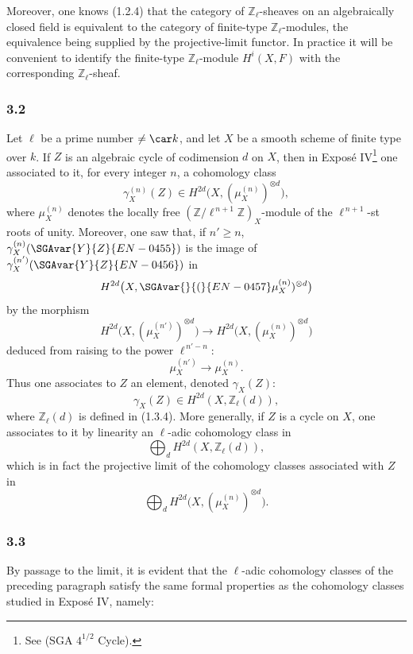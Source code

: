 Moreover, one knows (1.2.4) that the category of \(\mathbb Z_\ell\)-sheaves on an algebraically closed field is equivalent to the category of finite-type \(\mathbb Z_\ell\)-modules, the equivalence being supplied by the projective-limit functor. In practice it will be convenient to identify the finite-type \(\mathbb Z_\ell\)-module \(H^i(X,F)\) with the corresponding \(\mathbb Z_\ell\)-sheaf.

\subsubsection*{3.2}
Let \(\ell\) be a prime number \(\ne\car k\), and let \(X\) be a smooth scheme of finite type over \(k\). If \(Z\) is an algebraic cycle of codimension \(d\) on \(X\), then in Exposé IV\footnote{See (SGA \(4^{1/2}\) Cycle).} one associated to it, for every integer \(n\), a cohomology class
\[
\gamma_X^{(n)}(Z)\in H^{2d}\bigl(X,(\mu_X^{(n)})^{\otimes d}\bigr),
\]
where \(\mu_X^{(n)}\) denotes the locally free \((\mathbb Z/\ell^{\,n+1}\mathbb Z)_X\)-module of the \(\ell^{\,n+1}\)-st roots of unity. Moreover, one saw that, if \(n'\ge n\), \(\gamma_X^{(n)}(\SGAvar{Y}{Z}{EN-0455})\) is the image of \(\gamma_X^{(n')}(\SGAvar{Y}{Z}{EN-0456})\) in
\[
H^{2d}\bigl(X,\SGAvar{}{(}{EN-0457}\mu_X^{(n)})^{\otimes d}\bigr)
\]
by the morphism
\[
H^{2d}\bigl(X,(\mu_X^{(n')})^{\otimes d}\bigr)
\longrightarrow
H^{2d}\bigl(X,(\mu_X^{(n)})^{\otimes d}\bigr)
\]
deduced from raising to the power \(\ell^{\,n'-n}\):
\[
\mu_X^{(n')}\longrightarrow \mu_X^{(n)}.
\]
Thus one associates to \(Z\) an element, denoted \(\gamma_X(Z)\):
\[
\gamma_X(Z)\in H^{2d}(X,\mathbb Z_\ell(d)),
\]
where \(\mathbb Z_\ell(d)\) is defined in (1.3.4). More generally, if \(Z\) is a cycle on \(X\), one associates to it by linearity an \(\ell\)-adic cohomology class in
\[
\bigoplus_d H^{2d}(X,\mathbb Z_\ell(d)),
\]
which is in fact the projective limit of the cohomology classes associated with \(Z\) in
\[
\bigoplus_d H^{2d}\bigl(X,(\mu_X^{(n)})^{\otimes d}\bigr).
\]

\subsubsection*{3.3}
By passage to the limit, it is evident that the \(\ell\)-adic cohomology classes of the preceding paragraph satisfy the same formal properties as the cohomology classes studied in Exposé IV, namely:

